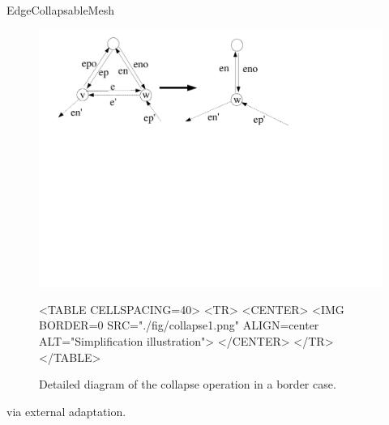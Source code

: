 \begin{ccRefConcept}{EdgeCollapsableMesh}
\begin{figure}[htbp]
\begin{ccTexOnly}
\begin{center}
\includegraphics[width=17cm]{Surface_mesh_simplification_ref/fig/collapse1} %
\end{center}
\end{ccTexOnly}
\begin{ccHtmlOnly}
<TABLE CELLSPACING=40>
<TR>
<CENTER>
<IMG BORDER=0 SRC="./fig/collapse1.png" ALIGN=center ALT="Simplification illustration">
</CENTER>
</TR>
</TABLE>
\end{ccHtmlOnly}
\caption{Detailed diagram of the collapse operation in a border case.}
\end{figure}


\ccHasModels
{} via external adaptation.

\ccSeeAlso
{}\\

\end{ccRefConcept}

